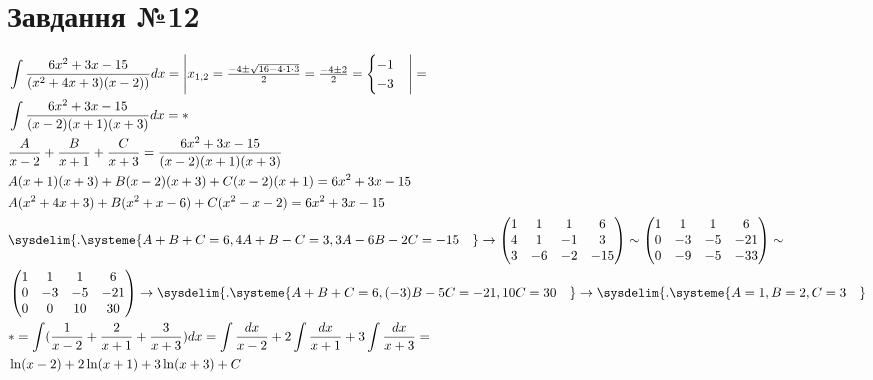 \documentclass{report}
\begin{document}
\section{Завдання №12}
\begin{equation}\begin{split}
	& \int \frac{6x^2 + 3x - 15}{(x^2 + 4x + 3)(x - 2))}dx = \begin{vmatrix}x_{1, 2} = \frac{-4 \pm \sqrt{16 - 4 \cdot 1 \cdot 3}}{2} = \frac{-4 \pm 2}{2} = \begin{cases}-1\\-3\end{cases}\end{vmatrix} =\\
	& \int \frac{6x^2 + 3x - 15}{(x - 2)(x + 1)(x + 3)}dx = \ast\\
	& \frac{A}{x-2} + \frac{B}{x+1} + \frac{C}{x +3} = \frac{6x^2 + 3x - 15}{(x - 2)(x + 1)(x + 3)}\\
	& A(x + 1)(x + 3) + B(x - 2)(x + 3) + C(x - 2)(x + 1) = 6x^2 + 3x - 15\\
	& A(x^2 + 4x + 3) + B(x^2 + x - 6) + C(x^2 - x - 2) = 6x^2 + 3x - 15\\
	& \sysdelim\{.\systeme{A + B + C = 6, 4A + B - C = 3, 3A - 6B - 2C = -15\quad} \to \begin{pmatrix}1 & 1 & 1 & 6\\ 4 & 1 & -1 & 3\\ 3 & -6 & -2 & -15\end{pmatrix} \sim \begin{pmatrix}1 & 1 & 1 & 6\\ 0 & -3 & -5 & -21\\ 0 & -9 & -5 & -33\end{pmatrix} \sim\\
	& \begin{pmatrix}1 & 1 & 1 & 6\\ 0 & -3 & -5 & -21\\ 0 & 0 & 10 & 30\end{pmatrix} \to \sysdelim\{.\systeme{A + B + C = 6, (-3)B - 5C = -21, 10C = 30\quad} \to \sysdelim\{.\systeme{A = 1, B = 2, C = 3\quad}\\
	& \ast = \int(\frac{1}{x-2} + \frac{2}{x+1} + \frac{3}{x + 3})dx = \int\frac{dx}{x-2} + 2\int\frac{dx}{x+1} + 3\int\frac{dx}{x + 3} =\\
	& \ln(x - 2) + 2\ln(x + 1) + 3\ln(x + 3) + C 
\end{split}\end{equation}
\end{document}
